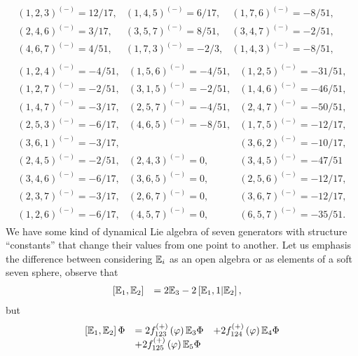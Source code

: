\documentclass[a4paper,12pt]{book}
\begin{document}
\begin{itemize}
\begin{equation}
\begin{array}{c}
\begin{array}{lll}
(1,2,3)^{(-)}=12/17, & (1,4,5)^{(-)}=6/17, & (1,7,6)^{(-)}=-8/51, \\ 
(2,4,6)^{(-)}=3/17, & (3,5,7)^{(-)}=8/51, & (3,4,7)^{(-)}=-2/51, \\ 
(4,6,7)^{(-)}=4/51, & (1,7,3)^{(-)}=-2/3, & (1,4,3)^{(-)}=-8/51,
\end{array}
\\ 
\begin{array}{lll}
(1,2,4)^{(-)}=-4/51, & (1,5,6)^{(-)}=-4/51, & (1,2,5)^{(-)}=-31/51, \\ 
(1,2,7)^{(-)}=-2/51, & (3,1,5)^{(-)}=-2/51, & (1,4,6)^{(-)}=-46/51, \\ 
(1,4,7)^{(-)}=-3/17, & (2,5,7)^{(-)}=-4/51, & (2,4,7)^{(-)}=-50/51, \\ 
(2,5,3)^{(-)}=-6/17, & (4,6,5)^{(-)}=-8/51, & (1,7,5)^{(-)}=-12/17, \\ 
(3,6,1)^{(-)}=-3/17, &  & (3,6,2)^{(-)}=-10/17, \\ 
(2,4,5)^{(-)}=-2/51, & (2,4,3)^{(-)}=0, & (3,4,5)^{(-)}=-47/51 \\ 
(3,4,6)^{(-)}=-6/17, & (3,6,5)^{(-)}=0, & (2,5,6)^{(-)}=-12/17, \\ 
(2,3,7)^{(-)}=-3/17, & (2,6,7)^{(-)}=0, & (3,6,7)^{(-)}=-12/17, \\ 
(1,2,6)^{(-)}=-6/17, & (4,5,7)^{(-)}=0, & (6,5,7)^{(-)}=-35/51.
\end{array}
\end{array}
\label{xxx2}
\end{equation}
We have some kind of dynamical Lie algebra of seven generators with
structure ``constants'' that change their values from one point to another.
Let us emphasis the difference between considering $\Bbb{E}_{i}$ as an open
algebra or as elements of a soft seven sphere, observe that 
\begin{equation}
\begin{array}{lll}
\left[ \Bbb{E}_{1},\Bbb{E}_{2}\right] & =2\Bbb{E}_{3}-2\left[ \Bbb{E}_{1},1|%
\Bbb{E}_{2}\right] , & 
\end{array}
\end{equation}
but 
\begin{equation}
\begin{array}{lll}
\left[ \Bbb{E}_{1},\Bbb{E}_{2}\right] \Phi & =2f_{123}^{\left( +\right)
}\left( \varphi \right) \Bbb{E}_{3}\Phi & +2f_{124}^{\left( +\right) }\left(
\varphi \right) \Bbb{E}_{4}\Phi \\ 
& +2f_{125}^{\left( +\right) }\left( \varphi \right) \Bbb{E}_{5}\Phi & 

\end{array}
\end{equation}
\end{itemize}
\end{document}
